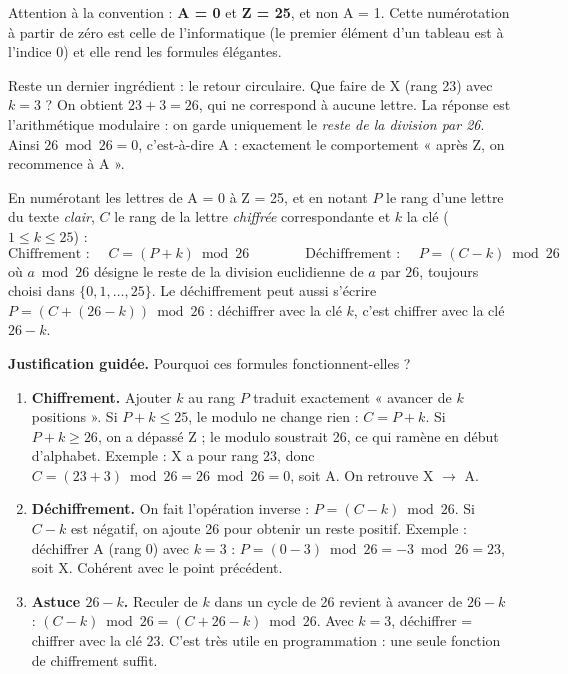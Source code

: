 \documentclass[11pt]{article}
\newcommand{\cle}[1]{{\popxbold\color{popdark}#1}}
\begin{document}
Attention à la convention : \textbf{A = 0} et \textbf{Z = 25}, et non A = 1. Cette numérotation à partir de zéro est celle de l'informatique (le premier élément d'un tableau est à l'indice 0) et elle rend les formules élégantes.

Reste un dernier ingrédient : le \cle{retour circulaire}. Que faire de X (rang 23) avec $k = 3$ ? On obtient $23 + 3 = 26$, qui ne correspond à aucune lettre. La réponse est l'\cle{arithmétique modulaire} : on garde uniquement le \emph{reste de la division par 26}. Ainsi $26 \bmod 26 = 0$, c'est-à-dire A : exactement le comportement « après Z, on recommence à A ».

\begin{propriete}
En numérotant les lettres de A = 0 à Z = 25, et en notant $P$ le rang d'une lettre du texte \emph{clair}, $C$ le rang de la lettre \emph{chiffrée} correspondante et $k$ la clé ($1 \le k \le 25$) :
\[ \text{Chiffrement : } \quad C = (P + k) \bmod 26 \qquad\qquad \text{Déchiffrement : } \quad P = (C - k) \bmod 26 \]
où $a \bmod 26$ désigne le reste de la division euclidienne de $a$ par $26$, toujours choisi dans $\{0, 1, \dots, 25\}$. Le déchiffrement peut aussi s'écrire $P = (C + (26 - k)) \bmod 26$ : déchiffrer avec la clé $k$, c'est chiffrer avec la clé $26 - k$.
\end{propriete}

\textbf{Justification guidée.} Pourquoi ces formules fonctionnent-elles ?
\begin{enumerate}
  \item \textbf{Chiffrement.} Ajouter $k$ au rang $P$ traduit exactement « avancer de $k$ positions ». Si $P + k \le 25$, le modulo ne change rien : $C = P + k$. Si $P + k \ge 26$, on a dépassé Z ; le modulo soustrait 26, ce qui ramène en début d'alphabet. Exemple : X a pour rang 23, donc $C = (23 + 3) \bmod 26 = 26 \bmod 26 = 0$, soit A. On retrouve X $\rightarrow$ A.
  \item \textbf{Déchiffrement.} On fait l'opération inverse : $P = (C - k) \bmod 26$. Si $C - k$ est négatif, on ajoute 26 pour obtenir un reste positif. Exemple : déchiffrer A (rang 0) avec $k = 3$ : $P = (0 - 3) \bmod 26 = -3 \bmod 26 = 23$, soit X. Cohérent avec le point précédent.
  \item \textbf{Astuce $26 - k$.} Reculer de $k$ dans un cycle de 26 revient à avancer de $26 - k$ : $(C - k) \bmod 26 = (C + 26 - k) \bmod 26$. Avec $k = 3$, déchiffrer = chiffrer avec la clé 23. C'est très utile en programmation : une seule fonction de chiffrement suffit.
\end{enumerate}
\end{document}
